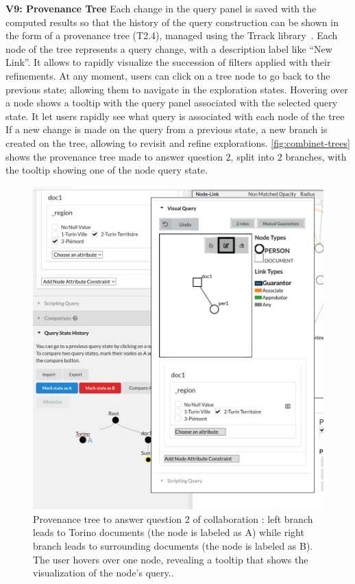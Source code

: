 \noindent\textbf{V9: Provenance Tree}
Each change in the query panel is saved with the computed results so that the history of the query construction can be shown in the form of a provenance tree (T2.4), managed using the Trrack library~\cite{cutlerTrrackLibraryProvenanceTracking2020}.
Each node of the tree represents a query change, with a description label like ``New Link''.
It allows to rapidly visualize the succession of filters applied with their refinements.
At any moment, users can click on a tree node to go back to the previous state; allowing them to navigate in the exploration states.
Hovering over a node shows a tooltip with the query panel associated with the selected query state.
It let users rapidly see what query is associated with each node of the tree
If a new change is made on the query from a previous state, a new branch is created on the tree, allowing to revisit and refine explorations.  \autoref{fig:combinet-trees} shows the provenance tree made to answer question 2, split into 2 branches, with the tooltip showing one of the node query state.

\begin{figure}[!h]
     \centering
     \includegraphics[width=0.5\linewidth]{static/figures/ComBiNet/tree_tooltip_torinoquery_crop}
     \caption{Provenance tree to answer question 2 of collaboration \pascal: left branch leads to Torino documents (the node is labeled as A) while right branch leads to surrounding documents (the node is labeled as B). The user hovers over one node, revealing a tooltip that shows the visualization of the node's query..}\label{fig:combinet-trees}
 \end{figure}


